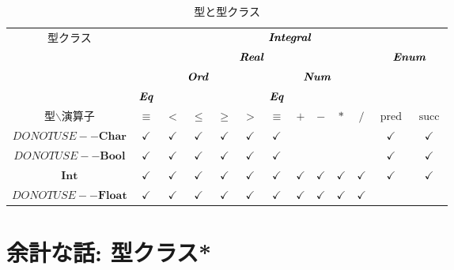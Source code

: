 \documentclass[a5paper,draft]{jsbook}
\newcommand{\mathTypeParameter}[1]{\mathbf{#1}}
\newcommand{\mathTypeName}[1]{\mathbf{#1}}
\newcommand{\mathTypeClass}[1]{\textbf{\emph{#1}}} %
\DeclareMathOperator{\mathPred}{pred}
\DeclareMathOperator{\mathSucc}{succ}
\newcommand{\hsklBool}{{DO NOT USE}--\mathTypeParameter{Bool}}
\newcommand{\hsklChar}{{DO NOT USE}--\mathTypeParameter{Char}}
\newcommand{\hsklFloat}{{DO NOT USE}--\mathTypeParameter{Float}}
\begin{document}
\begin{table*}
\caption{型と型クラス}
\label{tab:type-and-typeclass}
\begin{center}
\begin{tabular}{||c||c|c|c|c|c|c|c|c|c|c|c|c||}
\hline
\multirow{4}{*}{型クラス}
    &\multicolumn{12}{|c||}{$\mathTypeClass{Integral}$}\\
\cline{2-13}
\multirow{3}{*}{}
    &\multicolumn{10}{|c|}{$\mathTypeClass{Real}$}
    &\multicolumn{2}{|c||}{$\mathTypeClass{Enum}$}\\
\cline{2-11}
\multirow{2}{*}{}
    &\multicolumn{5}{|c|}{$\mathTypeClass{Ord}$}
    &\multicolumn{5}{|c|}{$\mathTypeClass{Num}$}
    &\multicolumn{2}{|c||}{ }\\
\cline{2-2}\cline{7-7}
{ }
    &$\mathTypeClass{Eq}$
    &\multicolumn{4}{|c|}{ }
    &$\mathTypeClass{Eq}$
    &\multicolumn{4}{|c|}{ }
    &\multicolumn{2}{|c||}{ }\\
\hline\hline
型$\backslash$演算子
    &$\equiv$
    &$<$
    &$\le$
    &$\ge$
    &$>$
    &$\equiv$
    &$+$
    &$-$
    &$*$
    &$/$
    &$\mathPred$
    &$\mathSucc$\\
\hline
$\hsklChar$
    &$\checkmark$
    &$\checkmark$
    &$\checkmark$
    &$\checkmark$
    &$\checkmark$
    &$\checkmark$
    &
    &
    &
    &
    &$\checkmark$
    &$\checkmark$\\
\hline
$\hsklBool$
    &$\checkmark$
    &$\checkmark$
    &$\checkmark$
    &$\checkmark$
    &$\checkmark$
    &$\checkmark$
    &
    &
    &
    &
    &$\checkmark$
    &$\checkmark$\\
\hline
$\mathTypeName{Int}$
    &$\checkmark$
    &$\checkmark$
    &$\checkmark$
    &$\checkmark$
    &$\checkmark$
    &$\checkmark$
    &$\checkmark$
    &$\checkmark$
    &$\checkmark$
    &$\checkmark$
    &$\checkmark$
    &$\checkmark$\\
\hline
$\hsklFloat$
    &$\checkmark$
    &$\checkmark$
    &$\checkmark$
    &$\checkmark$
    &$\checkmark$
    &$\checkmark$
    &$\checkmark$
    &$\checkmark$
    &$\checkmark$
    &$\checkmark$
    &
    &\\
\hline
\end{tabular}
\end{center}
\end{table*}

\section{余計な話: 型クラス*}
\end{document}
